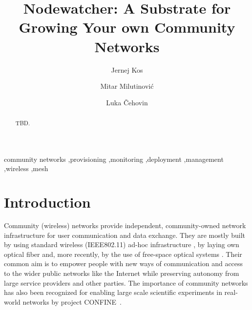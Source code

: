 \documentclass[5p,sort&compress]{elsarticle}
\begin{document}
\begin{frontmatter}
\title{Nodewatcher: A Substrate for Growing Your own Community Networks}

\author[fri,wlansi]{Jernej Kos}

\author[berkeley,wlansi]{Mitar Milutinović}

\author[fri,wlansi]{Luka Čehovin}


\address[fri]{University of Ljubljana, Faculty of Computer and Information Science, Ljubljana, Slovenia}

\address[berkeley]{University of California, Berkeley, USA}

\address[wlansi]{wlan slovenia, Open wireless network of Slovenia, \url{https://wlan-si.net}}

\begin{abstract}
TBD.
\end{abstract}

\begin{keyword}
community networks \sep provisioning \sep monitoring \sep deployment \sep management \sep wireless \sep mesh
\end{keyword}
\end{frontmatter}

\section{Introduction}

Community (wireless) networks \cite{Bruno_2005} provide independent, community-owned network infrastructure for user communication and data exchange.
They are mostly built by using standard wireless (IEEE802.11) ad-hoc infrastructure \cite{Akyildiz_2005}, by laying own optical fiber and, more recently, by the use of free-space optical systems \cite{Mustafa_2013}.
Their common aim is to empower people with new ways of communication and access to the wider public networks like the Internet while preserving autonomy from large service providers and other parties.
The importance of community networks has also been recognized for enabling large scale scientific experiments in real-world networks by project CONFINE~\cite{Braem_2013}.
\end{document}
